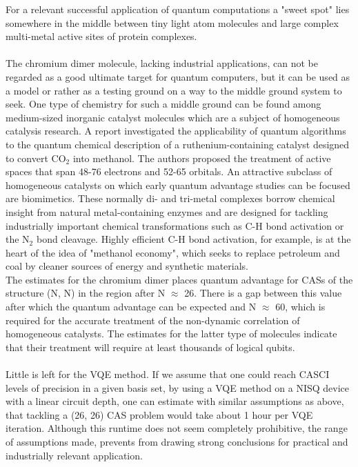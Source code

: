 For a relevant successful application of quantum computations a "sweet spot" lies somewhere in the middle between tiny light atom molecules and large complex multi-metal active sites of protein complexes. \\
\\
The chromium dimer molecule, lacking industrial applications, can not be regarded as a good ultimate target for quantum computers, but it can be used as a model or rather as a testing ground on a way to the middle ground system to seek. One type of chemistry for such a middle ground can be found among medium-sized inorganic catalyst molecules which are a subject of homogeneous catalysis research. A report \cite{vonBurg2021} investigated the applicability of quantum algorithms to the quantum chemical description of a ruthenium-containing catalyst designed to convert CO$_2$ into methanol. The authors proposed the treatment of active spaces that span 48-76 electrons and 52-65 orbitals. An attractive subclass of homogeneous catalysts on which early quantum advantage studies can be focused are biomimetics. These normally di- and tri-metal complexes borrow chemical insight from natural metal-containing enzymes and are designed for tackling industrially important chemical transformations such as C-H bond activation or the N$_2$ bond cleavage. Highly efficient C-H bond activation, for example, is at the heart of the idea of "methanol economy", which seeks to replace petroleum and coal by cleaner sources of energy and synthetic materials. \\
The estimates for the chromium dimer places quantum advantage for CASs of the structure (N, N) in the region after N $\approx$ 26. There is a gap between this value after which the quantum advantage can be expected and N $\approx$ 60, which is required for the accurate treatment of the non-dynamic correlation of homogeneous catalysts. The estimates for the latter type of molecules indicate that their treatment will require at least thousands of logical qubits. \\
\\
Little is left for the VQE method. If we assume that one could reach CASCI levels of precision in a given basis set, by using a VQE method on a NISQ device with a linear circuit depth, one can estimate with similar assumptions as above, that tackling a (26, 26) CAS problem would take about 1 hour per VQE iteration. Although this runtime does not seem completely prohibitive, the range of assumptions made, prevents from drawing strong conclusions for practical and industrially relevant application. \\
